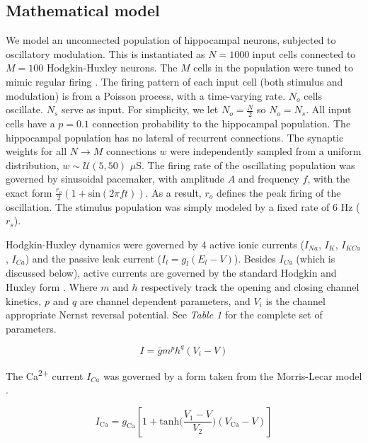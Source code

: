 \documentclass{article}
\begin{document}
\subsection*{Mathematical model}
We model an unconnected population of hippocampal neurons, subjected to oscillatory modulation. This is instantiated as $N = 1000$ input cells connected to $M = 100$ Hodgkin-Huxley neurons. The $M$ cells in the population were tuned to mimic regular firing \cite{Borgers2005,Borgers2008}. The firing pattern of each input cell (both stimulus and modulation) is from a Poisson process, with a time-varying rate. $N_o$ cells oscillate. $N_s$ serve as input. For simplicity, we let $N_o = \frac{N}{2}$ so $N_o = N_s$. All input cells have a $p = 0.1$ connection probability to the hippocampal population. The hippocampal population has no lateral of recurrent connections. The synaptic weights for all $N \rightarrow M$ connections $w$ were independently sampled from a uniform distribution, $w \sim \mathcal{U}(5, 50)$ $\mu$S. The firing rate of the oscillating population was governed by sinusoidal pacemaker, with amplitude $A$ and frequency $f$, with the exact form $\frac{r_o}{2} (1 + \text{sin}(2 \pi f t))$. As a result, $r_o$ defines the peak firing of the oscillation. The stimulus population was simply modeled by a fixed rate of 6 Hz ($r_s$). 

Hodgkin-Huxley dynamics were governed by 4 active ionic currents ($I_{Na}$, $I_{K}$, $I_{KCa}$, $I_{Ca}$) and the passive leak current ($I_l = g_l (E_l - V)$). Besides $I_{Ca}$ (which is discussed below), active currents are governed by the standard Hodgkin and Huxley form \cite{Hodgkin1952}. Where $m$ and $h$ respectively track the opening and closing channel kinetics, $p$ and $q$ are channel dependent parameters, and $V_i$ is the channel appropriate Nernst reversal potential. See \textit{Table 1} for the complete set of parameters.

\begin{equation}
\label{eq:Idef}
I = \bar{g} m^p h^q (V_i - V)
\end{equation}

The Ca\textsuperscript{2+} current $I_{Ca}$ was governed by a form taken from the Morris-Lecar model \cite{Morris1981,LeMasson1993,Siegel1994}.

\begin{equation}
I_\text{Ca} = g_\text{Ca} [1 + \text{tanh} \Big ( \frac{V_1 - V}{ V_2} \Big ) (V_\text{Ca} - V)]
\end{equation}
\end{document}
